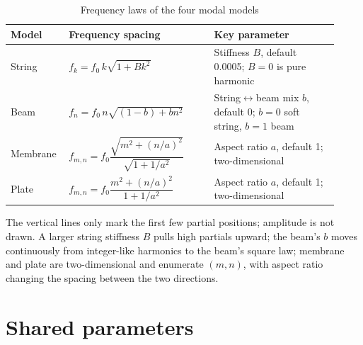\begin{table}[htbp]
\centering
\small
\begin{tabular}{@{}p{0.14\linewidth}p{0.42\linewidth}p{0.36\linewidth}@{}}
\hline
Model & Frequency spacing & Key parameter \\
\hline
String & $f_k=f_0\,k\sqrt{1+B k^2}$ & Stiffness $B$, default 0.0005; $B=0$ is pure harmonic \\
Beam & $f_n=f_0\,n\sqrt{(1-b)+b n^2}$ & String$\leftrightarrow$beam mix $b$, default 0; $b=0$ soft string, $b=1$ beam \\
Membrane & $f_{m,n}=f_0\dfrac{\sqrt{m^2+(n/a)^2}}{\sqrt{1+1/a^2}}$ & Aspect ratio $a$, default 1; two-dimensional \\
Plate & $f_{m,n}=f_0\dfrac{m^2+(n/a)^2}{1+1/a^2}$ & Aspect ratio $a$, default 1; two-dimensional \\
\hline
\end{tabular}
\caption{Frequency laws of the four modal models}
\label{tab:modal-models}
\end{table}

\begin{center}
\end{center}

The vertical lines only mark the first few partial positions; amplitude is not drawn. A larger string stiffness $B$ pulls high partials upward; the beam's $b$ moves continuously from integer-like harmonics to the beam's square law; membrane and plate are two-dimensional and enumerate $(m,n)$, with aspect ratio changing the spacing between the two directions.

\section{Shared parameters}


